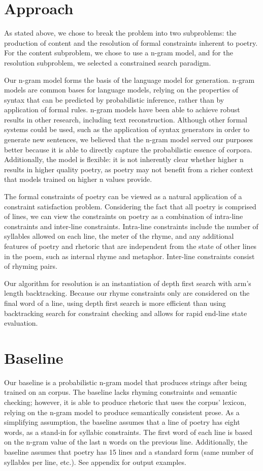 \documentclass[10pt,twocolumn]{article}
\begin{document}
\section{Approach}
As stated above, we chose to break the problem into two subproblems: the production of content and the resolution of formal constraints inherent to poetry. For the content subproblem, we chose to use a n-gram model, and for the resolution subproblem, we selected a constrained search paradigm. 

Our n-gram model forms the basis of the language model for generation. n-gram models are common bases for language models, relying on the properties of syntax that can be predicted by probabilistic inference, rather than by application of formal rules. n-gram models have been able to achieve robust results in other research, including text reconstruction. Although other formal systems could be used, such as the application of syntax generators in order to generate new sentences, we believed that the n-gram model served our purposes better because it is able to directly capture the probabilistic essence of corpora. Additionally, the model is flexible: it is not inherently clear whether higher n results in higher quality poetry, as poetry may not benefit from a richer context that models trained on higher n values provide. 

The formal constraints of poetry can be viewed as a natural application of a constraint satisfaction problem. Considering the fact that all poetry is comprised of lines, we can view the constraints on poetry as a combination of intra-line constraints and inter-line constraints. Intra-line constraints include the number of syllables allowed on each line, the meter of the rhyme, and any additional features of poetry and rhetoric that are independent from the state of other lines in the poem, such as internal rhyme and metaphor. Inter-line constraints consist of rhyming pairs.

Our algorithm for resolution is an instantiation of depth first search with arm's length backtracking. Because our rhyme constraints only are considered on the final word of a line, using depth first search is more efficient than using backtracking search for constraint checking and allows for rapid end-line state evaluation.

\section{Baseline}
Our baseline is a probabilistic n-gram model that produces strings after being trained on an corpus. The baseline lacks rhyming constraints and semantic checking; however, it is able to produce rhetoric that uses the corpus' lexicon, relying on the n-gram model to produce semantically consistent prose. As a simplifying assumption, the baseline assumes that a line of poetry has eight words, as a stand-in for syllabic constraints. The first word of each line is based on the n-gram value of the last n words on the previous line. Additionally, the baseline assumes that poetry has 15 lines and a standard form (same number of syllables per line, etc.). See appendix for output examples.
\end{document}
